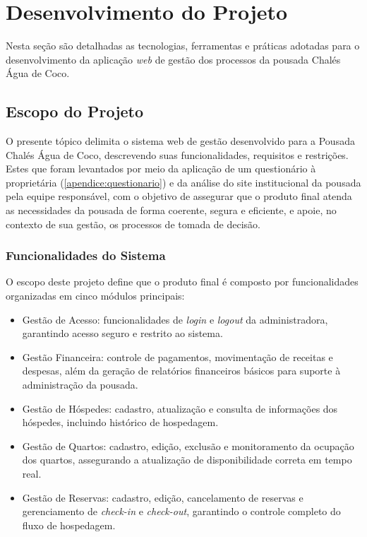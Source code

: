 \documentclass[
	12pt,				%
	openany,			%
	oneside,			%
	a4paper,			%
	english,			%
	french,				%
	spanish,			%
	brazil				%
	]{abntex2}
\begin{document}
\chapter{Desenvolvimento do Projeto}Nesta seção são detalhadas as tecnologias, ferramentas e práticas adotadas para o desenvolvimento da aplicação \textit{web} de gestão dos processos da pousada Chalés Água de Coco.
\section{Escopo do Projeto}
O presente tópico delimita o sistema web de gestão desenvolvido para a Pousada Chalés Água de Coco, descrevendo suas funcionalidades, requisitos e restrições. Estes que foram levantados por meio da aplicação de um questionário à proprietária (\autoref{apendice:questionario}) e da análise do site institucional da pousada  \cite{pousada_chales_agua_de_coco} pela equipe responsável, com o objetivo de assegurar que o produto final atenda as necessidades da pousada de forma coerente, segura  e eficiente, e apoie, no contexto de sua gestão, os processos de tomada de decisão. \\
\subsection{Funcionalidades do Sistema}
O escopo deste projeto define que o produto final é composto por funcionalidades organizadas em cinco módulos principais:

\begin{itemize}
	\item  Gestão de Acesso:   funcionalidades de \textit{login} e \textit{logout} da administradora, garantindo acesso seguro e restrito ao sistema.
	\item  Gestão Financeira: controle de pagamentos, movimentação de receitas e despesas, além da geração de relatórios financeiros básicos para suporte à administração da pousada.
	\item  Gestão de Hóspedes: cadastro, atualização e consulta de informações dos hóspedes, incluindo histórico de hospedagem.
	\item  Gestão de Quartos: cadastro, edição, exclusão e monitoramento da ocupação dos quartos, assegurando a atualização de disponibilidade correta em tempo real.
	\item  Gestão de Reservas: cadastro, edição, cancelamento de reservas e gerenciamento de \textit{check-in} e \textit{check-out}, garantindo o controle completo do fluxo de hospedagem.
\end{itemize}
\end{document}
